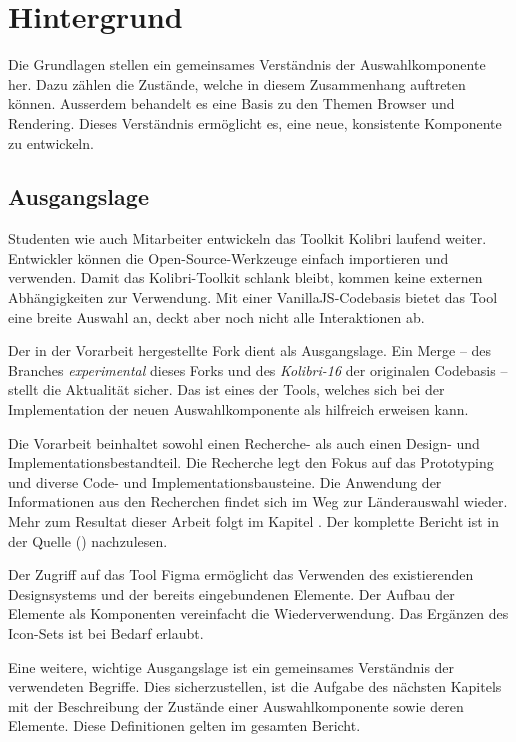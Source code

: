 \chapter{Hintergrund}
\label{chap:background}

Die Grundlagen stellen ein gemeinsames Verständnis der Auswahlkomponente her. 
Dazu zählen die Zustände, welche in diesem Zusammenhang auftreten können. 
Ausserdem behandelt es eine Basis zu den Themen Browser und Rendering. 
Dieses Verständnis ermöglicht es, eine neue, konsistente Komponente zu entwickeln.


\section{Ausgangslage}
\label{sec:basics}

Studenten wie auch Mitarbeiter entwickeln das Toolkit Kolibri laufend weiter. 
Entwickler können die Open-Source-Werkzeuge einfach importieren und verwenden.
Damit das Kolibri-Toolkit schlank bleibt, kommen keine externen Abhängigkeiten zur Verwendung. 
Mit einer VanillaJS-Codebasis bietet das Tool eine breite Auswahl an, deckt aber noch nicht alle Interaktionen ab. 

Der in der Vorarbeit hergestellte Fork dient als Ausgangslage.
Ein Merge – des Branches \emph{experimental} dieses Forks und des \emph{Kolibri-16} der originalen Codebasis – stellt die Aktualität sicher. 
Das  ist eines der Tools, welches sich bei der Implementation der neuen Auswahlkomponente als hilfreich erweisen kann. 

Die Vorarbeit\citemarktext{
    [\cite{ip5}]
} beinhaltet sowohl einen Recherche- als auch einen Design- und Implementationsbestandteil. 
Die Recherche legt den Fokus auf das Prototyping und diverse Code- und Implementationsbausteine. 
Die Anwendung der Informationen aus den Recherchen findet sich im Weg zur Länderauswahl wieder. 
Mehr zum Resultat dieser Arbeit folgt im Kapitel \textbf{}. 
Der komplette Bericht ist in der Quelle (\cite{ip5}) nachzulesen. 

Der Zugriff auf das Tool Figma ermöglicht das Verwenden des existierenden Designsystems und der bereits eingebundenen Elemente. 
Der Aufbau der Elemente als Komponenten vereinfacht die Wiederverwendung. 
Das Ergänzen des Icon-Sets ist bei Bedarf erlaubt. 

Eine weitere, wichtige Ausgangslage ist ein gemeinsames Verständnis der verwendeten Begriffe. 
Dies sicherzustellen, ist die Aufgabe des nächsten Kapitels mit der Beschreibung der Zustände einer Auswahlkomponente sowie deren Elemente. 
Diese Definitionen gelten im gesamten Bericht. 


